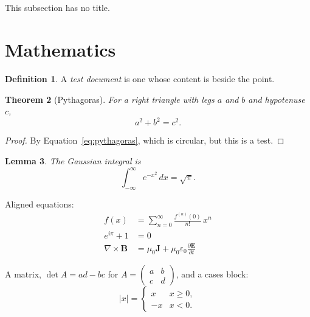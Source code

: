 \documentclass[11pt]{article}
\newtheorem{theorem}{Theorem}[section]
\newtheorem{lemma}[theorem]{Lemma}
\theoremstyle{definition}
\newtheorem{definition}[theorem]{Definition}
\begin{document}
\subsection{}
This subsection has no title.


\section{Mathematics}\label{sec:maths}

\begin{definition}
A \emph{test document} is one whose content is beside the point.
\end{definition}

\begin{theorem}[Pythagoras]\label{thm:pythagoras}
For a right triangle with legs $a$ and $b$ and hypotenuse $c$,
\begin{equation}\label{eq:pythagoras}
  a^2 + b^2 = c^2.
\end{equation}
\end{theorem}

\begin{proof}
By Equation~\eqref{eq:pythagoras}, which is circular, but this is a test.
\end{proof}

\begin{lemma}
The Gaussian integral is
\[
  \int_{-\infty}^{\infty} e^{-x^2}\,dx = \sqrt{\pi}.
\]
\end{lemma}

Aligned equations:
\begin{align}
  f(x) &= \sum_{n=0}^{\infty} \frac{f^{(n)}(0)}{n!}\, x^n \label{eq:taylor}\\
  e^{i\pi} + 1 &= 0 \\
  \nabla \times \mathbf{B} &= \mu_0 \mathbf{J} + \mu_0 \varepsilon_0 \frac{\partial \mathbf{E}}{\partial t}
\end{align}

A matrix, $\det A = ad - bc$ for
$A = \begin{pmatrix} a & b \\ c & d \end{pmatrix}$, and a cases block:
\[
  |x| = \begin{cases} x & x \ge 0, \\ -x & x < 0. \end{cases}
\]
\end{document}
